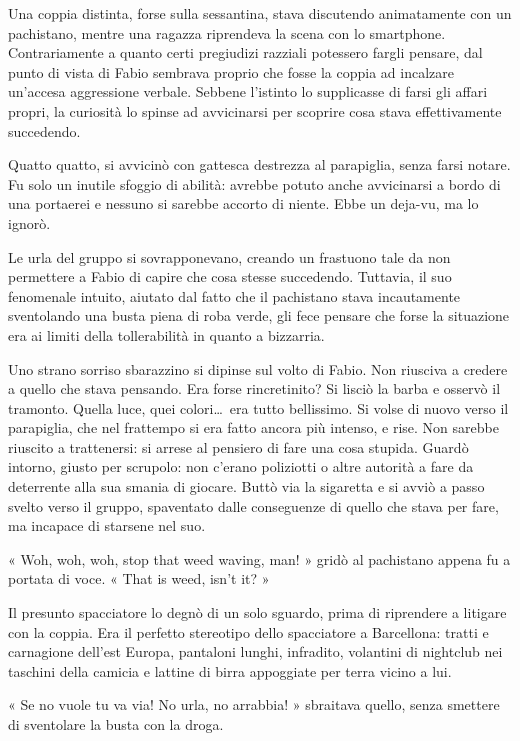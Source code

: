 Una coppia distinta, forse sulla sessantina, stava discutendo animatamente con un pachistano, mentre una ragazza riprendeva la scena con lo smartphone. Contrariamente a quanto certi pregiudizi razziali potessero fargli pensare, dal punto di vista di Fabio sembrava proprio che fosse la coppia ad incalzare un'accesa aggressione verbale. Sebbene l'istinto lo supplicasse di farsi gli affari propri, la curiosità lo spinse ad avvicinarsi per scoprire cosa stava effettivamente succedendo.

Quatto quatto, si avvicinò con gattesca destrezza al parapiglia, senza farsi notare. Fu solo un inutile sfoggio di abilità: avrebbe potuto anche avvicinarsi a bordo di una portaerei e nessuno si sarebbe accorto di niente. Ebbe un deja-vu, ma lo ignorò.

Le urla del gruppo si sovrapponevano, creando un frastuono tale da non permettere a Fabio di capire che cosa stesse succedendo. Tuttavia, il suo fenomenale intuito, aiutato dal fatto che il pachistano stava incautamente sventolando una busta piena di roba verde, gli fece pensare che forse la situazione era ai limiti della tollerabilità in quanto a bizzarria.

Uno strano sorriso sbarazzino si dipinse sul volto di Fabio. Non riusciva a credere a quello che stava pensando. Era forse rincretinito? Si lisciò la barba e osservò il tramonto. Quella luce, quei colori\ldots\ era tutto bellissimo. Si volse di nuovo verso il parapiglia, che nel frattempo si era fatto ancora più intenso, e rise. Non sarebbe riuscito a trattenersi: si arrese al pensiero di fare una cosa stupida. Guardò intorno, giusto per scrupolo: non c'erano poliziotti o altre autorità a fare da deterrente alla sua smania di giocare. Buttò via la sigaretta e si avviò a passo svelto verso il gruppo, spaventato dalle conseguenze di quello che stava per fare, ma incapace di starsene nel suo.

« Woh, woh, woh, stop that weed waving, man! » gridò al pachistano appena fu a portata di voce. « That is weed, isn't it? »

Il presunto spacciatore lo degnò di un solo sguardo, prima di riprendere a litigare con la coppia. Era il perfetto stereotipo dello spacciatore a Barcellona: tratti e carnagione dell'est Europa, pantaloni lunghi, infradito, volantini di nightclub nei taschini della camicia e lattine di birra appoggiate per terra vicino a lui.

« Se no vuole tu va via! No urla, no arrabbia! » sbraitava quello, senza smettere di sventolare la busta con la droga.

